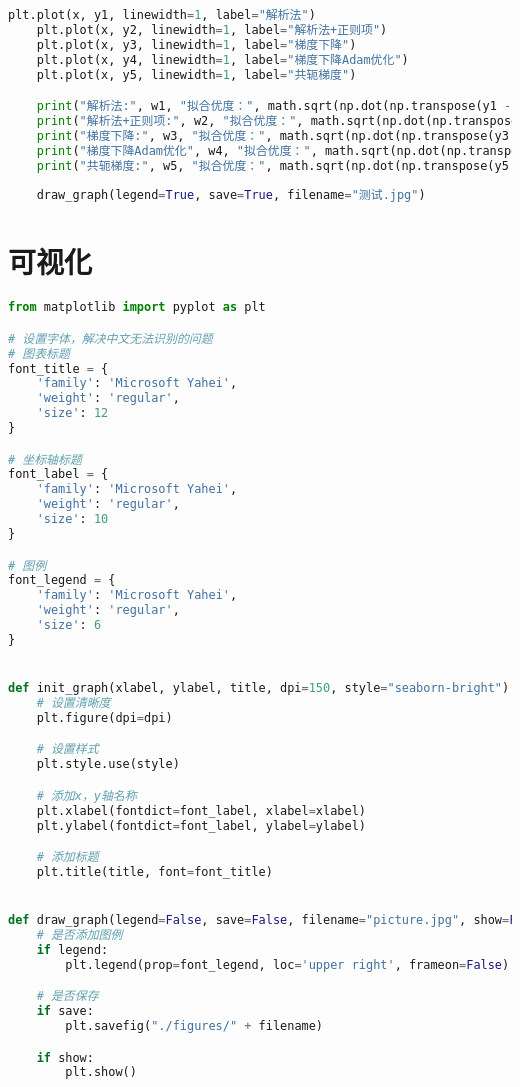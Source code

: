 \documentclass[withoutpreface,bwprint]{cumcmthesis}
\begin{document}
\begin{appendix}
\begin{lstlisting}[language=python]
    plt.plot(x, y1, linewidth=1, label="解析法")
    plt.plot(x, y2, linewidth=1, label="解析法+正则项")
    plt.plot(x, y3, linewidth=1, label="梯度下降")
    plt.plot(x, y4, linewidth=1, label="梯度下降Adam优化")
    plt.plot(x, y5, linewidth=1, label="共轭梯度")

    print("解析法:", w1, "拟合优度：", math.sqrt(np.dot(np.transpose(y1 - y_raw), y1 - y_raw) * 2 / num))
    print("解析法+正则项:", w2, "拟合优度：", math.sqrt(np.dot(np.transpose(y2 - y_raw), y2 - y_raw) * 2 / num))
    print("梯度下降:", w3, "拟合优度：", math.sqrt(np.dot(np.transpose(y3 - y_raw), y3 - y_raw) * 2 / num))
    print("梯度下降Adam优化", w4, "拟合优度：", math.sqrt(np.dot(np.transpose(y4 - y_raw), y4 - y_raw) * 2 / num))
    print("共轭梯度:", w5, "拟合优度：", math.sqrt(np.dot(np.transpose(y5 - y_raw), y5 - y_raw) * 2 / num))
    
    draw_graph(legend=True, save=True, filename="测试.jpg")

\end{lstlisting}

\section{可视化}
\begin{lstlisting}[language=python]
from matplotlib import pyplot as plt

# 设置字体，解决中文无法识别的问题
# 图表标题
font_title = {
    'family': 'Microsoft Yahei',
    'weight': 'regular',
    'size': 12
}

# 坐标轴标题
font_label = {
    'family': 'Microsoft Yahei',
    'weight': 'regular',
    'size': 10
}

# 图例
font_legend = {
    'family': 'Microsoft Yahei',
    'weight': 'regular',
    'size': 6
}


def init_graph(xlabel, ylabel, title, dpi=150, style="seaborn-bright"):
    # 设置清晰度
    plt.figure(dpi=dpi)

    # 设置样式
    plt.style.use(style)

    # 添加x，y轴名称
    plt.xlabel(fontdict=font_label, xlabel=xlabel)
    plt.ylabel(fontdict=font_label, ylabel=ylabel)

    # 添加标题
    plt.title(title, font=font_title)


def draw_graph(legend=False, save=False, filename="picture.jpg", show=False):
    # 是否添加图例
    if legend:
        plt.legend(prop=font_legend, loc='upper right', frameon=False)

    # 是否保存
    if save:
        plt.savefig("./figures/" + filename)

    if show:
        plt.show()
\end{lstlisting}
\end{appendix}
\end{document}
